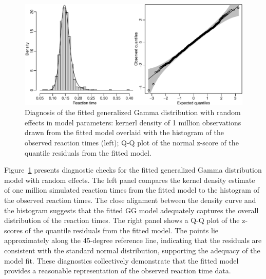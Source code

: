 \documentclass[12pt, letterpaper]{article}
\begin{document}
\begin{figure}[tbp]
  \centering
  \includegraphics[width=\textwidth]{diagnosis.pdf}
  \caption{Diagnosis of the fitted generalized Gamma distribution with
    random effects in model parameters: kernerl density of 1 million
    observations drawn from the fitted model overlaid with the
    histogram of the observed reaction times (left); Q-Q plot of the
    normal z-score of the quantile residuals from the fitted model.}
  \label{fig:diagnosis}
\end{figure}


Figure~\ref{fig:diagnosis} presents diagnostic checks for the fitted 
generalized Gamma distribution model with random effects. The left 
panel compares the kernel density estimate of one million simulated reaction 
times from the fitted model to the histogram of the observed reaction times. 
The close alignment between the density curve and the histogram suggests that 
the fitted GG model adequately captures the overall distribution of the 
reaction times. The right panel shows a Q-Q plot of the z-scores of the 
quantile residuals from the fitted model. The points lie approximately along 
the 45-degree reference line, indicating that the residuals are consistent 
with the standard normal distribution, supporting the adequacy of the model 
fit. These diagnostics collectively demonstrate that the fitted model provides 
a reasonable representation of the observed reaction time data.


\end{document}
